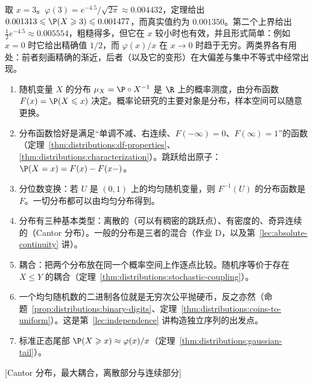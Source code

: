\begin{example}
取 $x=3$。$\varphi(3)=e^{-4.5}/\sqrt{2\pi}\approx0.004432$，定理给出 $0.001313\leqslant \P(X\geqslant3)\leqslant0.001477$，而真实值约为 $0.001350$。第二个上界给出 $\frac12e^{-4.5}\approx0.005554$，粗糙得多，但它在 $x$ 较小时也有效，并且形式简单：例如 $x=0$ 时它给出精确值 $1/2$，而 $\varphi(x)/x$ 在 $x\to0$ 时趋于无穷。两类界各有用处：前者刻画精确的渐近，后者（以及它的变形）在大偏差与集中不等式中经常出现。
\end{example}


\begin{enumerate}
\item 随机变量 $X$ 的分布 $\mu_X=\P\circ X^{-1}$ 是 $\R$ 上的概率测度，由分布函数 $F(x)=\P(X\leqslant x)$ 决定。概率论研究的主要对象是分布，样本空间可以随意更换。
\item 分布函数恰好是满足“单调不减、右连续、$F(-\infty)=0$、$F(\infty)=1$”的函数（定理~\ref{thm:distributions:df-properties}、\ref{thm:distributions:characterization}）。跳跃给出原子：$\P(X=x)=F(x)-F(x-)$。
\item 分位数变换：若 $U$ 是 $(0,1)$ 上的均匀随机变量，则 $F^{-1}(U)$ 的分布函数是 $F$。一切分布都可以由均匀分布得到。
\item 分布有三种基本类型：离散的（可以有稠密的跳跃点）、有密度的、奇异连续的（Cantor 分布）。一般的分布是三者的混合（作业 D，以及第~\ref{lec:absolute-continuity} 讲）。
\item 耦合：把两个分布放在同一个概率空间上作逐点比较。随机序等价于存在 $X\leqslant Y$ 的耦合（定理~\ref{thm:distributions:stochastic-coupling}）。
\item 一个均匀随机数的二进制各位就是无穷次公平抛硬币，反之亦然（命题~\ref{prop:distributions:binary-digits}、定理~\ref{thm:distributions:coins-to-uniform}）。这是第~\ref{lec:independence} 讲构造独立序列的出发点。
\item 标准正态尾部 $\P(X\geqslant x)\approx\varphi(x)/x$（定理~\ref{thm:distributions:gaussian-tail}）。
\end{enumerate}

[Cantor 分布，最大耦合，离散部分与连续部分]
\label{hw:distributions}


